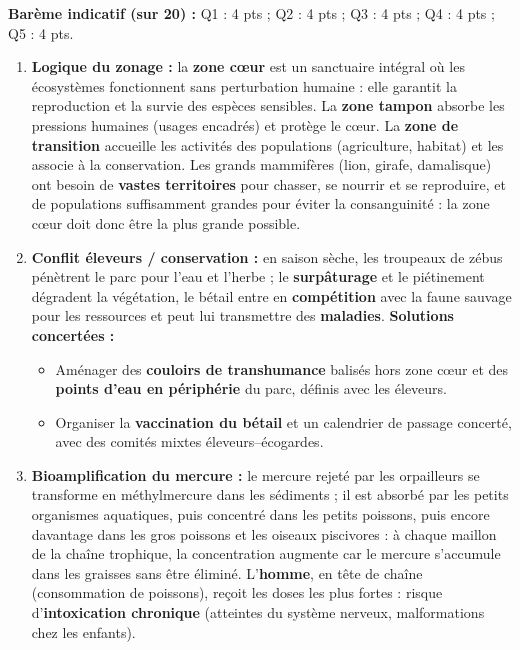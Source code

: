 \documentclass[11pt]{article}
\begin{document}
\begin{corrige}
\textbf{Barème indicatif (sur 20) :} Q1 : 4 pts ; Q2 : 4 pts ; Q3 : 4 pts ; Q4 : 4 pts ; Q5 : 4 pts.

\begin{enumerate}
    \item \textbf{Logique du zonage :} la \textbf{zone cœur} est un sanctuaire intégral où les écosystèmes fonctionnent sans perturbation humaine : elle garantit la reproduction et la survie des espèces sensibles. La \textbf{zone tampon} absorbe les pressions humaines (usages encadrés) et protège le cœur. La \textbf{zone de transition} accueille les activités des populations (agriculture, habitat) et les associe à la conservation. Les grands mammifères (lion, girafe, damalisque) ont besoin de \textbf{vastes territoires} pour chasser, se nourrir et se reproduire, et de populations suffisamment grandes pour éviter la consanguinité : la zone cœur doit donc être la plus grande possible.
    \item \textbf{Conflit éleveurs / conservation :} en saison sèche, les troupeaux de zébus pénètrent le parc pour l'eau et l'herbe ; le \textbf{surpâturage} et le piétinement dégradent la végétation, le bétail entre en \textbf{compétition} avec la faune sauvage pour les ressources et peut lui transmettre des \textbf{maladies}. \textbf{Solutions concertées :}
    \begin{itemize}
        \item Aménager des \textbf{couloirs de transhumance} balisés hors zone cœur et des \textbf{points d'eau en périphérie} du parc, définis avec les éleveurs.
        \item Organiser la \textbf{vaccination du bétail} et un calendrier de passage concerté, avec des comités mixtes éleveurs--écogardes.
    \end{itemize}
    \item \textbf{Bioamplification du mercure :} le mercure rejeté par les orpailleurs se transforme en méthylmercure dans les sédiments ; il est absorbé par les petits organismes aquatiques, puis concentré dans les petits poissons, puis encore davantage dans les gros poissons et les oiseaux piscivores : à chaque maillon de la chaîne trophique, la concentration augmente car le mercure s'accumule dans les graisses sans être éliminé. L'\textbf{homme}, en tête de chaîne (consommation de poissons), reçoit les doses les plus fortes : risque d'\textbf{intoxication chronique} (atteintes du système nerveux, malformations chez les enfants).

\end{enumerate}
\end{corrige}
\end{document}
